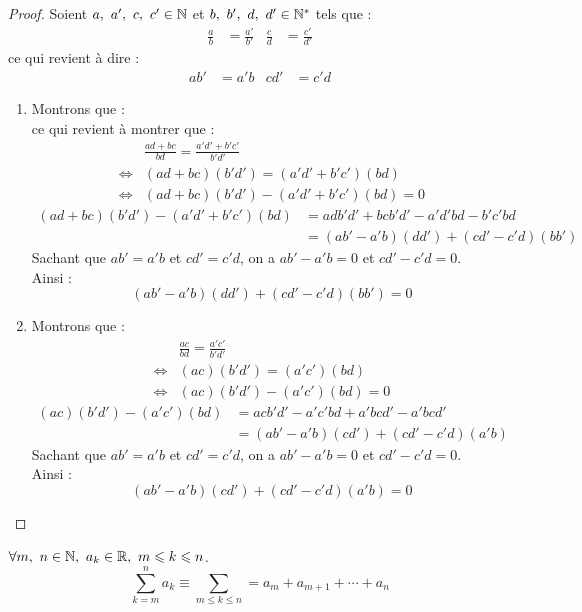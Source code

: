 \begin{proof}
	Soient $a,\ a',\ c,\ c' \in \mathbb{N}$ et $b,\ b',\ d,\ d' \in \mathbb{N}^*$ tels que :
	\begin{align*}
		\frac{a}{b} &= \frac{a'}{b'} & \frac{c}{d} &= \frac{c'}{d'}
	\end{align*}
	ce qui revient à dire :
	\begin{align*}
		ab' &= a'b & cd' &= c'd
	\end{align*}
	\begin{enumerate}
		\item Montrons que :
		\[  \]
		ce qui revient à montrer que :
		\begin{align*}
			&\frac{ad + bc}{bd} = \frac{a'd' + b'c'}{b'd'} \\
			\iff &(ad + bc)(b'd') = (a'd' + b'c')(bd)
			\\
			\iff &(ad + bc)(b'd') - (a'd' + b'c')(bd) = 0
		\end{align*}
		\begin{align*}
			(ad + bc)(b'd') - (a'd' + b'c')(bd) &= adb'd' + bcb'd' - a'd'bd - b'c'bd \\
			&= (ab' - a'b)(dd') + (cd' - c'd)(bb')
		\end{align*}
		Sachant que $ab' = a'b$ et $cd' = c'd$, on a $ab' - a'b = 0$ et $cd' - c'd = 0$.
		\\
		Ainsi :
		\[ (ab' - a'b)(dd') + (cd' - c'd)(bb') = 0 \]
		\item Montrons que :
		\begin{align*}
			&\frac{ac}{bd} = \frac{a'c'}{b'd'} \\
			\iff &(ac)(b'd') = (a'c')(bd) \\
			\iff &(ac)(b'd') - (a'c')(bd) = 0
		\end{align*}
		\begin{align*}
			(ac)(b'd') - (a'c')(bd) &= acb'd' - a'c'bd + a'bcd' - a'bcd' \\
			&= (ab' - a'b)(cd') + (cd' - c'd)(a'b) 
		\end{align*}
		Sachant que $ab' = a'b$ et $cd' = c'd$, on a $ab' - a'b = 0$ et $cd' - c'd = 0$.
		\\
		Ainsi :
		\[ (ab' - a'b)(cd') + (cd' - c'd)(a'b) = 0 \]
	\end{enumerate}
\end{proof}

\begin{definition}[Somme]
    $\forall m,\ n \in \mathbb{N},\ a_k \in \mathbb{R},\ m \leqslant k \leqslant n$.
    \[ \sum_{k = m}^n a_k \equiv \sum_{m \leq k \leq n} = a_m + a_{m + 1} + \cdots + a_n \]
\end{definition}


